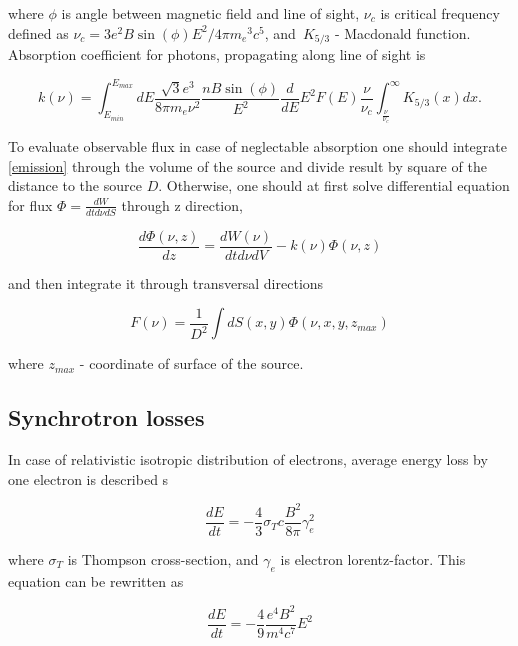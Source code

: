 where $\phi$ is angle between magnetic field and line of sight, $\displaystyle\nu_{c}$ is critical frequency defined as $\displaystyle\nu_{c} = 3 e^{2} B \sin(\phi) E^{2}/4\pi {m_{e}}^{3} c^{5}$, and~$K_{5/3}$ - Macdonald function.
Absorption coefficient for photons, propagating along line of sight is

\begin{equation}\label{absorption}
	k(\nu)=\int_{E_{min}}^{E_{max}}dE\frac {\sqrt {3}{e}^{3}}{8\pi m_e \nu^2}\frac{n B\sin(\phi)}{E^2}
	\frac{d}{dE} E^2 F(E)\frac {\nu}{ \nu_c}\int_{\frac {\nu}{ \nu_c}}^{\infty }K_{5/3}(x) dx.
\end{equation}

To evaluate observable flux in case of neglectable absorption one should integrate \ref{emission} through the volume of the source and divide result by square of the distance to the source $D$. Otherwise, one should at first solve differential equation for flux $\Phi=\frac{dW}{dt d\nu dS}$ through z direction,

\begin{equation}
\frac{d\Phi(\nu,z)}{dz} = \frac{dW(\nu)}{dt d\nu dV} - k(\nu)\Phi(\nu,z)
\end{equation}

and then integrate it through transversal directions

\begin{equation}
	F(\nu)=\frac{1}{D^2}\int dS(x,y) \Phi(\nu, x,y,z_{max})
\end{equation}

where $z_{max}$ - coordinate of surface of the source.

\subsection*{Synchrotron losses}

In case of relativistic isotropic distribution of electrons, average energy loss by one electron is described s

\begin{equation}
	\frac{dE}{dt} = -\frac{4}{3} \sigma_T c \frac{B^2}{8 \pi} \gamma_e^2
\end{equation}

where $\sigma_T$ is Thompson cross-section, and $\gamma_e$ is electron lorentz-factor. This equation can be rewritten as

\begin{equation} \label{synchlosses}
	\frac{dE}{dt} = - \frac{4}{9} \frac{e^4 B^2}{m^4 c^7} E^2
\end{equation}

